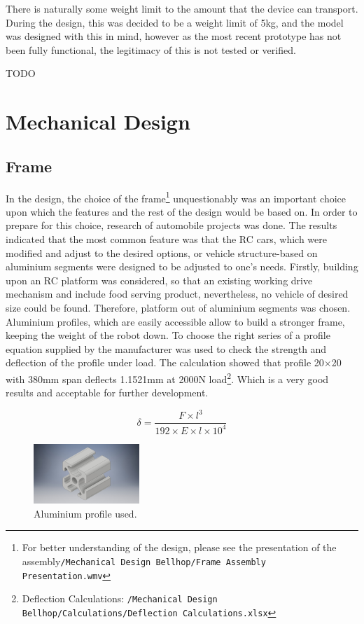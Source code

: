 \documentclass[11pt]{article}
\begin{document}
There is naturally some weight limit to the amount that the device can transport. During the design, this was decided to be a weight limit of 5kg, and the model was designed with this in mind, however as the most recent prototype has not been fully functional, the legitimacy of this is not tested or verified.

TODO
\newpage
\section{Mechanical Design}
\subsection*{Frame}
In the design, the choice of the frame\footnote{For better understanding of the design, please see the presentation of the assembly\texttt{/Mechanical Design Bellhop/Frame Assembly Presentation.wmv}} unquestionably was an important choice upon which the features and the rest of the design would be based on. In order to prepare for this choice, research of automobile projects was done. The results indicated that the most common feature was that the RC cars, which were modified and adjust to the desired options, or vehicle structure-based on aluminium segments were designed to be adjusted to one's needs. Firstly, building upon an RC platform was considered, so that an existing working drive mechanism and include food serving product, nevertheless, no vehicle of desired size could be found. Therefore, platform out of aluminium segments was chosen. Aluminium profiles, which are easily accessible allow to build a stronger frame, keeping the weight of the robot down. To choose the right series of a profile equation supplied by the manufacturer was used to check the strength and deflection of the profile under load. The calculation showed that profile 20$\times$20 with 380mm span deflects 1.1521mm at 2000N load\footnote{Deflection Calculations: \texttt{/Mechanical Design Bellhop/Calculations/Deflection Calculations.xlsx}}. Which is a very good results and acceptable for further development.

$$\delta=\frac{F\times l^3}{192\times E\times l\times 10^4}$$


\begin{figure}
  \includegraphics[width=4cm]{profile}
  \caption{Aluminium profile used.}
  \label{profile}
\end{figure}
\end{document}

